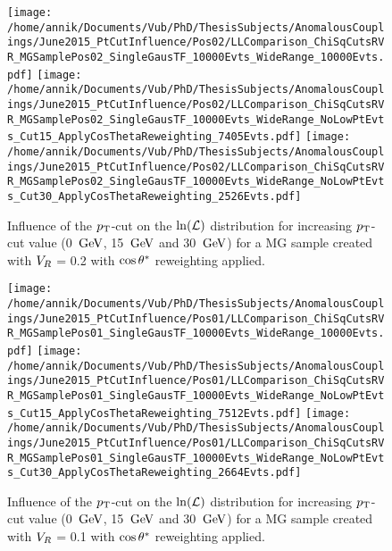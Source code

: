\begin{figure}[h!t]
 \centering
 \texttt{[image: /home/annik/Documents/Vub/PhD/ThesisSubjects/AnomalousCouplings/June2015\_PtCutInfluence/Pos02/LLComparison\_ChiSqCutsRVR\_MGSamplePos02\_SingleGausTF\_10000Evts\_WideRange\_10000Evts.pdf]}
 \texttt{[image: /home/annik/Documents/Vub/PhD/ThesisSubjects/AnomalousCouplings/June2015\_PtCutInfluence/Pos02/LLComparison\_ChiSqCutsRVR\_MGSamplePos02\_SingleGausTF\_10000Evts\_WideRange\_NoLowPtEvts\_Cut15\_ApplyCosThetaReweighting\_7405Evts.pdf]}
 \texttt{[image: /home/annik/Documents/Vub/PhD/ThesisSubjects/AnomalousCouplings/June2015\_PtCutInfluence/Pos02/LLComparison\_ChiSqCutsRVR\_MGSamplePos02\_SingleGausTF\_10000Evts\_WideRange\_NoLowPtEvts\_Cut30\_ApplyCosThetaReweighting\_2526Evts.pdf]}
 \caption{Influence of the $p_{\textrm T}$-cut on the $\ln(\mathcal{L})$ distribution for increasing $p_{\textrm T}$-cut value (0 $\, \mathrm{GeV}$, 15 $\, \mathrm{GeV}$ and 30 $\, \mathrm{GeV}$) for a MG sample created with $V_{R}$ = 0.2 with $\cos \theta^{*}$ reweighting applied.}
 \label{fig::CosThetaPos02}
\end{figure}

\begin{figure}[h!t]
 \centering
 \texttt{[image: /home/annik/Documents/Vub/PhD/ThesisSubjects/AnomalousCouplings/June2015\_PtCutInfluence/Pos01/LLComparison\_ChiSqCutsRVR\_MGSamplePos01\_SingleGausTF\_10000Evts\_WideRange\_10000Evts.pdf]}
 \texttt{[image: /home/annik/Documents/Vub/PhD/ThesisSubjects/AnomalousCouplings/June2015\_PtCutInfluence/Pos01/LLComparison\_ChiSqCutsRVR\_MGSamplePos01\_SingleGausTF\_10000Evts\_WideRange\_NoLowPtEvts\_Cut15\_ApplyCosThetaReweighting\_7512Evts.pdf]}
 \texttt{[image: /home/annik/Documents/Vub/PhD/ThesisSubjects/AnomalousCouplings/June2015\_PtCutInfluence/Pos01/LLComparison\_ChiSqCutsRVR\_MGSamplePos01\_SingleGausTF\_10000Evts\_WideRange\_NoLowPtEvts\_Cut30\_ApplyCosThetaReweighting\_2664Evts.pdf]}
 \caption{Influence of the $p_{\textrm T}$-cut on the $\ln(\mathcal{L})$ distribution for increasing $p_{\textrm T}$-cut value (0 $\, \mathrm{GeV}$, 15 $\, \mathrm{GeV}$ and 30 $\, \mathrm{GeV}$) for a MG sample created with $V_{R}$ = 0.1 with $\cos \theta^{*}$ reweighting applied.}
 \label{fig::CosThetaPos01}
\end{figure}


